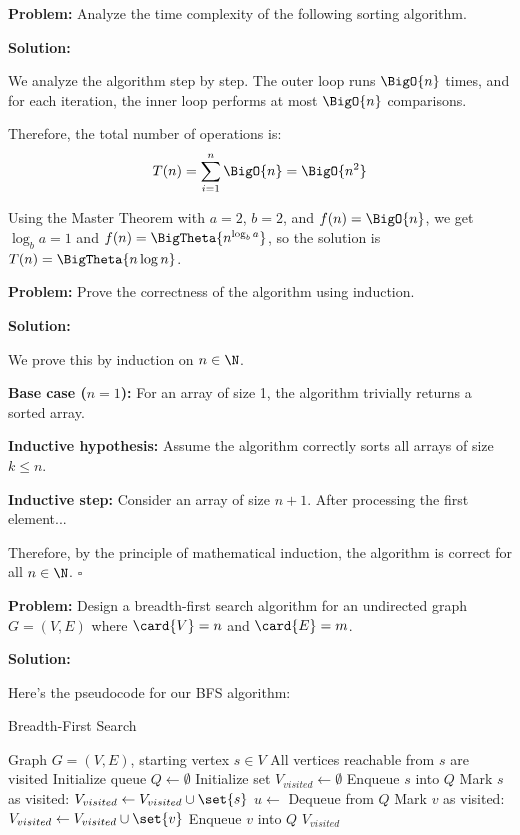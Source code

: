 

\textbf{Problem:} Analyze the time complexity of the following sorting algorithm.

\textbf{Solution:}

We analyze the algorithm step by step. The outer loop runs $\BigO{n}$ times, and for each iteration, the inner loop performs at most $\BigO{n}$ comparisons.

Therefore, the total number of operations is:
\[
    T(n) = \sum_{i=1}^{n} \BigO{n} = \BigO{n^2}
\]

Using the Master Theorem with $a=2$, $b=2$, and $f(n) = \BigO{n}$, we get $\log_b a = 1$ and $f(n) = \BigTheta{n^{\log_b a}}$, so the solution is $T(n) = \BigTheta{n \log n}$.


\textbf{Problem:} Prove the correctness of the algorithm using induction.

\textbf{Solution:}

We prove this by induction on $n \in \N$.

\textbf{Base case ($n=1$):} For an array of size 1, the algorithm trivially returns a sorted array.

\textbf{Inductive hypothesis:} Assume the algorithm correctly sorts all arrays of size $k \leq n$.

\textbf{Inductive step:} Consider an array of size $n+1$. After processing the first element...

Therefore, by the principle of mathematical induction, the algorithm is correct for all $n \in \N$. \hfill$\square$



\textbf{Problem:} Design a breadth-first search algorithm for an undirected graph $G = (V, E)$ where $\card{V} = n$ and $\card{E} = m$.

\textbf{Solution:}

Here's the pseudocode for our BFS algorithm:

\begin{algorithm}
\caption{Breadth-First Search}\label{alg:bfs}
\begin{algorithmic}[1]
\Require Graph $G = (V, E)$, starting vertex $s \in V$
\Ensure All vertices reachable from $s$ are visited
\State Initialize queue $Q \gets \emptyset$
\State Initialize set $V_{visited} \gets \emptyset$
\State Enqueue $s$ into $Q$
\State Mark $s$ as visited: $V_{visited} \gets V_{visited} \cup \set{s}$
    \State $u \gets$ Dequeue from $Q$
            \State Mark $v$ as visited: $V_{visited} \gets V_{visited} \cup \set{v}$
            \State Enqueue $v$ into $Q$
        \EndIf
    \EndFor
\EndWhile
\State \Return $V_{visited}$
\end{algorithmic}
\end{algorithm}

